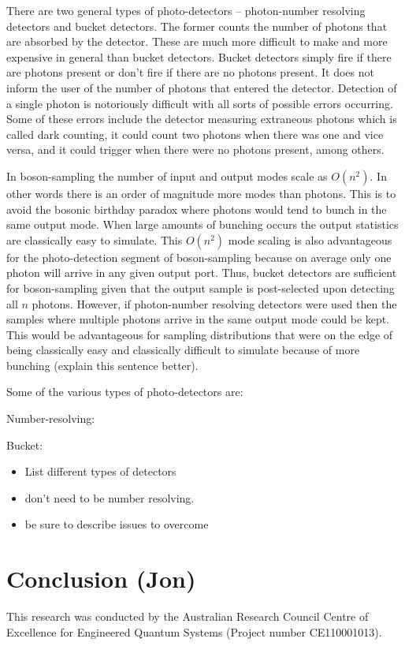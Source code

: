\documentclass[aps,pra,twocolumn,amsmath,amssymb,nofootinbib,superscriptaddress]{revtex4}
\begin{document}
There are two general types of photo-detectors -- photon-number resolving detectors and bucket detectors. The former counts the number of photons that are absorbed by the detector. These are much more difficult to make and more expensive in general than bucket detectors. Bucket detectors simply fire if there are photons present or don't fire if there are no photons present. It does not inform the user of the number of photons that entered the detector. Detection of a single photon is notoriously difficult with all sorts of possible errors occurring. Some of these errors include the detector measuring extraneous photons which is called dark counting, it could count two photons when there was one and vice versa, and it could trigger when there were no photons present, among others.

In boson-sampling the number of input and output modes scale as $O(n^2)$. In other words there is an order of magnitude more modes than photons. This is to avoid the bosonic birthday paradox where photons would tend to bunch in the same output mode. When large amounts of bunching occurs the output statistics are classically easy to simulate. This $O(n^2)$ mode scaling is also advantageous for the photo-detection segment of boson-sampling because on average only one photon will arrive in any given output port. Thus, bucket detectors are sufficient for boson-sampling given that the output sample is post-selected upon detecting all $n$ photons. However, if photon-number resolving detectors were used then the samples where multiple photons arrive in the same output mode could be kept. This would be advantageous for sampling distributions that were on the edge of being classically easy and classically difficult to simulate because of more bunching (explain this sentence better). 

Some of the various types of photo-detectors are:

Number-resolving:

Bucket:


\begin{itemize}
\item List different types of detectors
\item don't need to be number resolving.
\item be sure to describe issues to overcome
\end{itemize}

\section{Conclusion (Jon)}

%
%

\begin{acknowledgments}
This research was conducted by the Australian Research Council Centre of Excellence for Engineered Quantum Systems (Project number CE110001013).
\end{acknowledgments}

%
%


\end{document}
